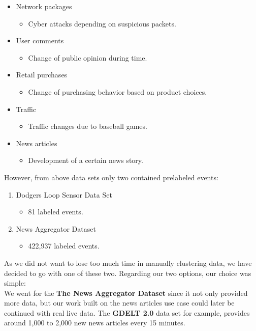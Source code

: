 \begin{itemize}
    \item Network packages
        \begin{itemize}
            \item Cyber attacks depending on suspicious packets.
        \end{itemize}
    \item User comments
        \begin{itemize}
            \item Change of public opinion during time.
        \end{itemize}
    \item Retail purchases
        \begin{itemize}
            \item Change of purchasing behavior based on product choices.
        \end{itemize}
    \item Traffic
        \begin{itemize}
            \item Traffic changes due to baseball games.
        \end{itemize}
    \item News articles
        \begin{itemize}
            \item Development of a certain news story.
        \end{itemize}
\end{itemize}

However, from above data sets only two contained prelabeled events:

\begin{enumerate}
    \item Dodgers Loop Sensor Data Set
        \begin{itemize}
            \item 81 labeled events. %
        \end{itemize}
    \item News Aggregator Dataset
        \begin{itemize}
            \item 422,937 labeled events. %
        \end{itemize}
\end{enumerate}

As we did not want to lose too much time in manually clustering data,
we have decided to go with one of these two.
Regarding our two options, our choice was simple:\\
We went for the \textbf{The News Aggregator Dataset} since it not only provided more data,
but our work built on the news articles use case could later be continued with real live data.
The \textbf{GDELT 2.0} data set for example, provides around 1,000 to 2,000 new news articles every 15 minutes.

